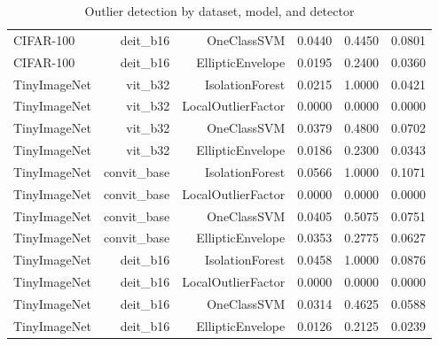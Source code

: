 \begin{table}[htbp]
\begin{tabular}{lrrrrr}
CIFAR-100 & deit\_b16 & OneClassSVM & 0.0440 & 0.4450 & 0.0801 \\
CIFAR-100 & deit\_b16 & EllipticEnvelope & 0.0195 & 0.2400 & 0.0360 \\
TinyImageNet & vit\_b32 & IsolationForest & 0.0215 & 1.0000 & 0.0421 \\
TinyImageNet & vit\_b32 & LocalOutlierFactor & 0.0000 & 0.0000 & 0.0000 \\
TinyImageNet & vit\_b32 & OneClassSVM & 0.0379 & 0.4800 & 0.0702 \\
TinyImageNet & vit\_b32 & EllipticEnvelope & 0.0186 & 0.2300 & 0.0343 \\
TinyImageNet & convit\_base & IsolationForest & 0.0566 & 1.0000 & 0.1071 \\
TinyImageNet & convit\_base & LocalOutlierFactor & 0.0000 & 0.0000 & 0.0000 \\
TinyImageNet & convit\_base & OneClassSVM & 0.0405 & 0.5075 & 0.0751 \\
TinyImageNet & convit\_base & EllipticEnvelope & 0.0353 & 0.2775 & 0.0627 \\
TinyImageNet & deit\_b16 & IsolationForest & 0.0458 & 1.0000 & 0.0876 \\
TinyImageNet & deit\_b16 & LocalOutlierFactor & 0.0000 & 0.0000 & 0.0000 \\
TinyImageNet & deit\_b16 & OneClassSVM & 0.0314 & 0.4625 & 0.0588 \\
TinyImageNet & deit\_b16 & EllipticEnvelope & 0.0126 & 0.2125 & 0.0239 \\
\bottomrule
\end{tabular}
\caption{Outlier detection by dataset, model, and detector}
\label{tab:table6}
\end{table}
